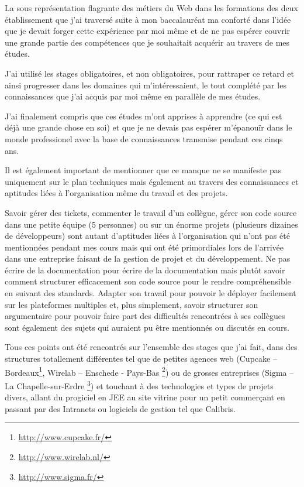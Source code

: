 \documentclass[12pt,a4paper]{book}
\begin{document}
La sous représentation flagrante des métiers du Web dans les formations des deux établissement que j'ai traversé suite à mon baccalauréat ma conforté dans l'idée que je devait forger cette expérience par moi même et de ne pas espérer couvrir une grande partie des compétences que je souhaitait acquérir au travers de mes études.

J'ai utilisé les stages obligatoires, et non obligatoires, pour rattraper ce retard et ainsi progresser dans les domaines qui m'intéressaient, le tout complété par les connaissances que j'ai acquis par moi même en parallèle de mes études.

J'ai finalement compris que ces études m'ont apprises à apprendre (ce qui est déjà une grande chose en soi) et que je ne devais pas espérer m'épanouïr dans le monde professionel avec la base de connaissances transmise pendant ces cinqs ans.

Il est également important de mentionner que ce manque ne se manifeste pas uniquement sur le plan techniques mais également au travers des connaissances et aptitudes liées à l'organisation même du travail et des projets. 

Savoir gérer des tickets, commenter le travail d'un collègue, gérer son code source dans une petite équipe (5 personnes) ou sur un énorme projets (plusieurs dizaines de développeurs) sont autant d'aptitudes liées à l'organisation qui n'ont pas été mentionnées pendant mes cours mais qui ont été primordiales lors de l'arrivée dans une entreprise faisant de la gestion de projet et du développement.
Ne pas écrire de la documentation pour écrire de la documentation mais plutôt savoir comment structurer efficacement son code source pour le rendre compréhensible en suivant des standards. Adapter son travail pour pouvoir le déployer facilement sur les plateformes multiples et, plus simplement, savoir structurer son argumentaire pour pouvoir faire part des difficultés rencontrées à ses collègues sont également des sujets qui auraient pu être mentionnés ou discutés en cours. 

Tous ces points ont été rencontrés sur l'ensemble des stages que j'ai fait, dans des structures totallement différentes tel que de petites agences web (Cupcake -- Bordeaux\footnote{\url{http://www.cupcake.fr/}}, Wirelab -- Enschede - Pays-Bas \footnote{\url{http://www.wirelab.nl/}}) ou de grosses entreprises (Sigma -- La Chapelle-sur-Erdre \footnote{\url{http://www.sigma.fr/}}) et touchant à des technologies et types de projets divers, allant du progiciel en JEE au site vitrine pour un petit commerçant en passant par des Intranets ou logiciels de gestion tel que Calibris.
\end{document}
